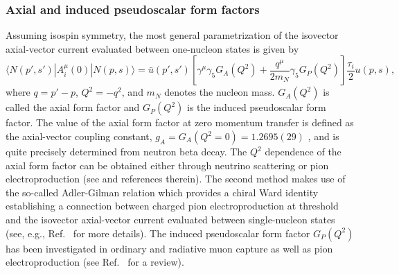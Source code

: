 \documentclass[twoside,12pt]{article}
\begin{document}
\subsubsection{Axial and induced pseudoscalar form factors}
   Assuming isospin symmetry, the most general
parametrization of the isovector axial-vector current evaluated
between one-nucleon states is given by
\begin{equation}\label{H1_axff_FFDef}
\langle N(p',s')| A^\mu_i(0) |N(p,s) \rangle = \bar{u}(p',s')
\left[\gamma^\mu\gamma_5 G_A(Q^2) +\frac{q^\mu}{2m_N}\gamma_5
G_P(Q^2) \right] \frac{\tau_i}{2}u(p,s),
\end{equation}
where $q=p'-p$, $Q^2=-q^2$, and $m_N$ denotes the nucleon mass.
   $G_A(Q^2)$ is called the axial form factor and
$G_P(Q^2)$ is the induced pseudoscalar form factor.
     The value of the axial form factor at zero momentum transfer is defined as
the axial-vector coupling constant, $g_A=G_A(Q^2=0) =1.2695(29)$ \cite{PDG_2008},
and is quite precisely determined from neutron beta decay.
   The $Q^2$ dependence of the axial form factor can be obtained
either through neutrino scattering or pion electroproduction
(see \cite{Bernard:2001rs} and references therein).
   The second method makes use of the so-called Adler-Gilman relation
\cite{Adler:1966gd} which provides a chiral Ward identity
establishing a connection between charged pion electroproduction at
threshold and the isovector axial-vector current evaluated between
single-nucleon states (see, e.g., Ref.\ \cite{Scherer:1991cy} for more details).
   The induced pseudoscalar form factor $G_P(Q^2)$ has been investigated in
ordinary and radiative muon capture as well as pion
electroproduction (see Ref.\ \cite{Gorringe:2002xx} for a review).
\end{document}
